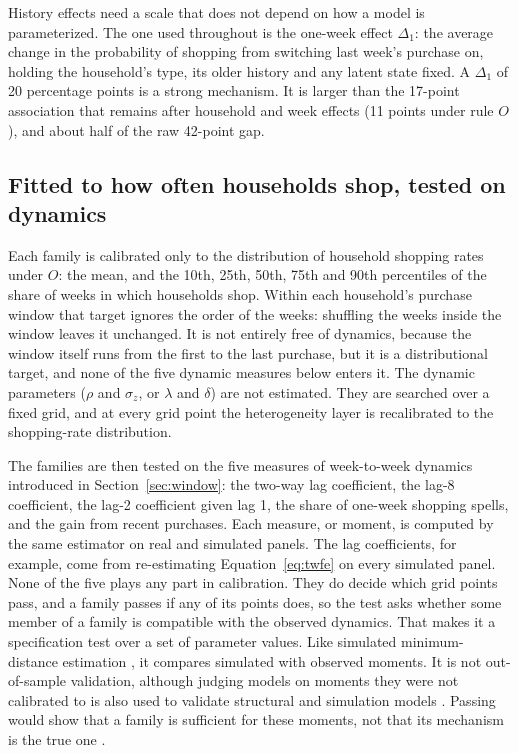 \documentclass[11pt]{article}
\begin{document}
History effects need a scale that does not depend on how a model is parameterized. The one
used throughout is the one-week effect $\Delta_1$: the average change in the probability of
shopping from switching last week's purchase on, holding the household's type, its older
history and any latent state fixed. A $\Delta_1$ of 20 percentage points is a strong
mechanism. It is larger than the 17-point association that remains after household and week
effects (11 points under rule $O$), and about half of the raw 42-point gap.

\subsection{Fitted to how often households shop, tested on dynamics}

Each family is calibrated only to the distribution of household shopping rates under $O$:
the mean, and the 10th, 25th, 50th, 75th and 90th percentiles of the share of weeks in which
households shop. Within each household's purchase window that target ignores the order of the
weeks: shuffling the weeks inside the window leaves it unchanged. It is not entirely free of
dynamics, because the window itself runs from the first to the last purchase, but it is a
distributional target, and none of the five dynamic measures below enters it. The dynamic
parameters ($\rho$ and $\sigma_z$, or $\lambda$ and $\delta$) are not estimated. They are
searched over a fixed grid, and at every grid point the heterogeneity layer is recalibrated to
the shopping-rate distribution.

The families are then tested on the five measures of week-to-week dynamics introduced in
Section~\ref{sec:window}: the two-way lag coefficient, the lag-8 coefficient, the lag-2
coefficient given lag 1, the share of one-week shopping spells, and the gain from recent
purchases. Each
measure, or moment, is computed by the same estimator on real and simulated panels. The lag
coefficients, for example, come from re-estimating Equation~\eqref{eq:twfe} on every simulated
panel. None of the five plays any part in calibration. They do decide which grid points pass,
and a family passes if any of its points does, so the test asks whether some member of a
family is compatible with the observed dynamics. That makes it a specification test over a set
of parameter values. Like simulated minimum-distance estimation
\citep{mcfadden1989,pakes_pollard}, it compares simulated with
observed moments. It is not out-of-sample validation, although judging models on moments they
were not calibrated to is also used to validate structural and simulation models
\citep{todd_wolpin,grimm2005}. Passing would
show that a family is sufficient for these moments, not that its mechanism is the true one
\citep{fagiolo_moneta_windrum,poile_safayeni,carrella2021}.
\end{document}
